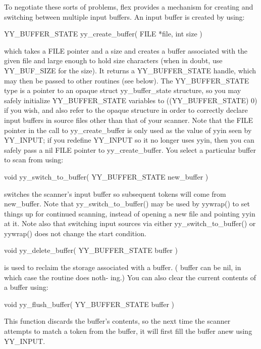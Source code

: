 \documentclass[12pt,spanish,twocolumn,lettersize]{article}
\begin{document}
{       To  negotiate  these  sorts  of	problems, flex provides a
       mechanism for  creating	and  switching	between	 multiple
       input buffers.  An input buffer is created by using:

	   YY_BUFFER_STATE yy_create_buffer( FILE *file, int size )

       which takes a FILE pointer and a size and creates a buffer
       associated with the given file and large	 enough	 to  hold
       size  characters	 (when	in doubt, use YY_BUF_SIZE for the
       size).  It returns a  YY_BUFFER_STATE  handle,  which  may
       then  be	 passed	 to  other  routines  (see  below).   The
       YY_BUFFER_STATE type is a  pointer  to  an  opaque  struct
       yy_buffer_state	structure,  so	you may safely initialize
       YY_BUFFER_STATE variables to ((YY_BUFFER_STATE) 0) if  you
       wish,  and  also refer to the opaque structure in order to
       correctly declare input buffers in source files other than
       that  of	 your scanner.	Note that the FILE pointer in the
       call to yy_create_buffer is only used as the value of yyin
       seen by YY_INPUT; if you redefine YY_INPUT so it no longer
       uses yyin, then you can safely pass a nil FILE pointer  to
       yy_create_buffer.   You select a particular buffer to scan
       from using:

	   void yy_switch_to_buffer( YY_BUFFER_STATE new_buffer )

       switches the scanner's input buffer so  subsequent  tokens
       will	 come	  from	   new_buffer.	    Note     that
       yy_switch_to_buffer() may  be  used  by	yywrap()  to  set
       things up for continued scanning, instead of opening a new
       file and pointing yyin at it.  Note  also  that	switching
       input sources via either yy_switch_to_buffer() or yywrap()
       does not change the start condition.

	   void yy_delete_buffer( YY_BUFFER_STATE buffer )

       is used to reclaim the storage associated with  a  buffer.
       (  buffer can be nil, in which case the routine does noth-
       ing.)  You can also clear the current contents of a buffer
       using:

	   void yy_flush_buffer( YY_BUFFER_STATE buffer )

       This  function discards the buffer's contents, so the next
       time the scanner	 attempts  to  match  a	 token	from  the
       buffer, it will first fill the buffer anew using YY_INPUT.

}
\end{document}
